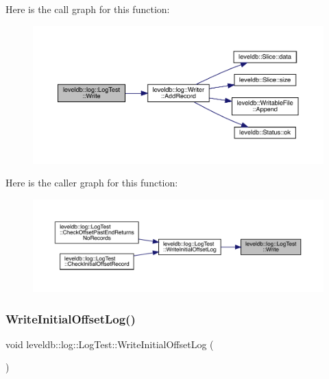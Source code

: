 Here is the call graph for this function\+:
\nopagebreak
\begin{figure}[H]
\begin{center}
\leavevmode
\includegraphics[width=350pt]{classleveldb_1_1log_1_1_log_test_ab8af1c9335e7fbb42e06a6c01de2d0fc_cgraph}
\end{center}
\end{figure}
Here is the caller graph for this function\+:
\nopagebreak
\begin{figure}[H]
\begin{center}
\leavevmode
\includegraphics[width=350pt]{classleveldb_1_1log_1_1_log_test_ab8af1c9335e7fbb42e06a6c01de2d0fc_icgraph}
\end{center}
\end{figure}
\mbox{\label{classleveldb_1_1log_1_1_log_test_af0053e30c5ccaa5e2e10d595a4f48565}} 
\subsubsection{\texorpdfstring{WriteInitialOffsetLog()}{WriteInitialOffsetLog()}}
{\footnotesize\ttfamily void leveldb\+::log\+::\+Log\+Test\+::\+Write\+Initial\+Offset\+Log (\begin{DoxyParamCaption}{ }\end{DoxyParamCaption})\hspace{0.3cm}{\ttfamily [inline]}}


